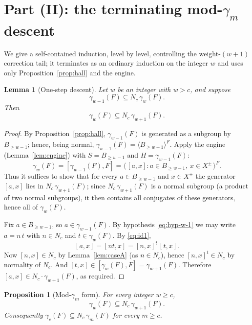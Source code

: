 \documentclass{amsart}
\newtheorem{lemma}{Lemma}
\newtheorem{proposition}{Proposition}
\theoremstyle{definition}
\theoremstyle{remark}
\begin{document}
\section{Part (II): the terminating mod-$\gamma_m$ descent}\label{sec:reduction}

We give a self-contained induction, level by level, controlling the
weight-$(w{+}1)$ correction tail; it terminates as an ordinary induction on the
integer $w$ and uses only Proposition~\ref{prop:hall} and the engine.

\begin{lemma}[One-step descent]\label{lem:onestep}
Let $w$ be an integer with $w>c$, and suppose
\begin{equation}\label{eq:hyp-w-1}
\gamma_{w-1}(F)\subseteq N_c\,\gamma_{w}(F).
\end{equation}
Then
\begin{equation}\label{eq:concl-w}
\gamma_{w}(F)\subseteq N_c\,\gamma_{w+1}(F).
\end{equation}
\end{lemma}

\begin{proof}
By Proposition~\ref{prop:hall}, $\gamma_{w-1}(F)$ is generated as a subgroup by
$B_{\ge w-1}$; hence, being normal, $\gamma_{w-1}(F)=\langle B_{\ge w-1}\rangle^{F}$.
Apply the engine (Lemma~\ref{lem:engine}) with $S=B_{\ge w-1}$ and
$H=\gamma_{w-1}(F)$:
\[
\gamma_w(F)=[\gamma_{w-1}(F),F]
=\big\langle\,[a,x] : a\in B_{\ge w-1},\ x\in X^{\pm}\,\big\rangle^{F}.
\]
Thus it suffices to show that for every $a\in B_{\ge w-1}$ and $x\in X^{\pm}$ the
generator $[a,x]$ lies in $N_c\,\gamma_{w+1}(F)$; since $N_c\,\gamma_{w+1}(F)$ is a
normal subgroup (a product of two normal subgroups), it then contains all
conjugates of these generators, hence all of $\gamma_w(F)$.

Fix $a\in B_{\ge w-1}$, so $a\in\gamma_{w-1}(F)$. By hypothesis
\eqref{eq:hyp-w-1} we may write $a=n\,t$ with $n\in N_c$ and $t\in\gamma_w(F)$.
By \eqref{eq:id1},
\[
[a,x]=[nt,x]=[n,x]^{t}\,[t,x].
\]
Now $[n,x]\in N_c$ by Lemma~\ref{lem:caseA} (as $n\in N_c$), hence
$[n,x]^{t}\in N_c$ by normality of $N_c$. And $[t,x]\in[\gamma_w(F),F]
=\gamma_{w+1}(F)$. Therefore $[a,x]\in N_c\cdot\gamma_{w+1}(F)$, as required.
\end{proof}

\begin{proposition}[Mod-$\gamma_m$ form]\label{prop:moddescent}
For every integer $w\ge c$,
\begin{equation}\label{eq:E_w}
\gamma_w(F)\subseteq N_c\,\gamma_{w+1}(F).
\end{equation}
Consequently $\gamma_c(F)\subseteq N_c\,\gamma_m(F)$ for every $m\ge c$.
\end{proposition}
\end{document}

